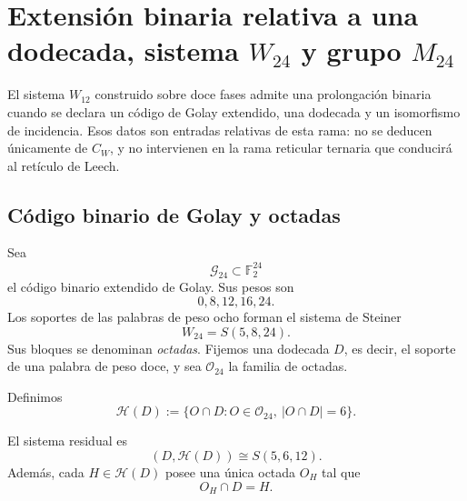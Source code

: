 
\section{Extensión binaria relativa a una dodecada, sistema \texorpdfstring{\(W_{24}\)}{W24} y grupo \texorpdfstring{\(M_{24}\)}{M24}}
\label{p12-83-c20-s3:chap:dodecada-w24-m24}

El sistema \(W_{12}\) construido sobre doce fases admite una prolongación
binaria cuando se declara un código de Golay extendido, una dodecada y un
isomorfismo de incidencia. Esos datos son entradas relativas de esta rama:
no se deducen únicamente de \(C_W\), y no intervienen en la rama reticular
ternaria que conducirá al retículo de Leech.

\subsection{Código binario de Golay y octadas}

Sea
\[
 \mathcal G_{24}\subset\mathbb F_2^{24}
\]
el código binario extendido de Golay. Sus pesos son
\begin{equation}
 0, 8, 12, 16, 24.
 \label{p12-83-c20-s3:eq:pesos-golay-binario-extendido}
\end{equation}
Los soportes de las palabras de peso ocho forman el sistema de Steiner
\begin{equation}
 W_{24}=S(5,8,24).
 \label{p12-83-c20-s3:eq:w24-steiner-octadas}
\end{equation}
Sus bloques se denominan \emph{octadas}. Fijemos una dodecada \(D\), es
decir, el soporte de una palabra de peso doce, y sea \(\mathcal O_{24}\)
la familia de octadas.

Definimos
\begin{equation}
 \mathcal H(D)
 :=\{O\cap D:O\in\mathcal O_{24},\ |O\cap D|=6\}.
 \label{p12-83-c20-s3:eq:hexadas-residuales-dodecada}
\end{equation}

\begin{theorem}
\label{p12-83-c20-s3:thm:diseno-residual-dodecada-autonomo}
El sistema residual es
\begin{equation}
 \boxed{(D,\mathcal H(D))\cong S(5,6,12).}
 \label{p12-83-c20-s3:eq:diseno-residual-dodecada-w12}
\end{equation}
Además, cada \(H\in\mathcal H(D)\) posee una única octada \(O_H\) tal que
\begin{equation}
 O_H\cap D=H.
 \label{p12-83-c20-s3:eq:elevacion-unica-hexada-octada}
\end{equation}
\end{theorem}

